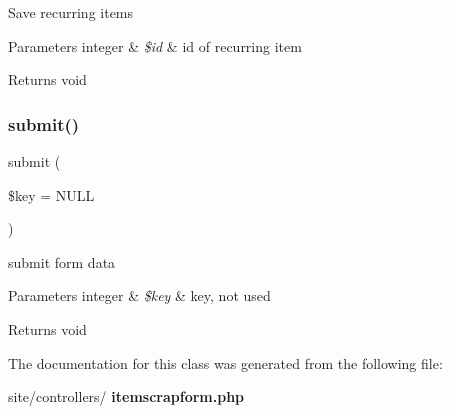 Save recurring items


\begin{DoxyParams}[1]{Parameters}
integer & {\em \$id} & id of recurring item\\
\hline
\end{DoxyParams}
\begin{DoxyReturn}{Returns}
void 
\end{DoxyReturn}
\mbox{\label{classtks__agenda_controller_item_scrap_form_a493fb229d53aa4f6cfe7bbd1104fc27d}} 
\subsubsection{submit()}
{\footnotesize\ttfamily submit (\begin{DoxyParamCaption}\item[{}]{\$key = {\ttfamily NULL} }\end{DoxyParamCaption})}

submit form data


\begin{DoxyParams}[1]{Parameters}
integer & {\em \$key} & key, not used\\
\hline
\end{DoxyParams}
\begin{DoxyReturn}{Returns}
void 
\end{DoxyReturn}


The documentation for this class was generated from the following file\+:\begin{DoxyCompactItemize}
\item 
site/controllers/\textbf{ itemscrapform.\+php}\end{DoxyCompactItemize}
